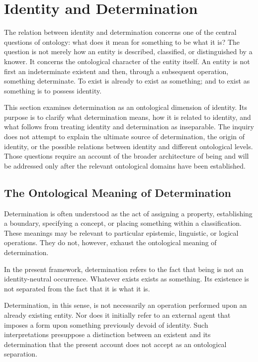 
\section{Identity and Determination}
\label{sec:identity-and-determination}

The relation between identity and determination concerns one of the central
questions of ontology: what does it mean for something to be what it is?
The question is not merely how an entity is described, classified, or
distinguished by a knower. It concerns the ontological character of the entity
itself. An entity is not first an indeterminate existent and then, through a
subsequent operation, something determinate. To exist is already to exist as
something; and to exist as something is to possess identity.

This section examines determination as an ontological dimension of
identity. Its purpose is to clarify what determination means, how it is
related to identity, and what follows from treating identity and
determination as inseparable. The inquiry does not attempt to explain the
ultimate source of determination, the origin of identity, or the possible
relations between identity and different ontological levels. Those questions
require an account of the broader architecture of being and will be
addressed only after the relevant ontological domains have been established.

\subsection{The Ontological Meaning of Determination}

Determination is often understood as the act of assigning a property,
establishing a boundary, specifying a concept, or placing something within
a classification. These meanings may be relevant to particular epistemic,
linguistic, or logical operations. They do not, however, exhaust the
ontological meaning of determination.

In the present framework, determination refers to the fact that being is
not an identity-neutral occurrence. Whatever exists exists as something.
Its existence is not separated from the fact that it is what it is.

Determination, in this sense, is not necessarily an operation performed
upon an already existing entity. Nor does it initially refer to an external
agent that imposes a form upon something previously devoid of identity.
Such interpretations presuppose a distinction between an existent and
its determination that the present account does not accept as an
ontological separation.

